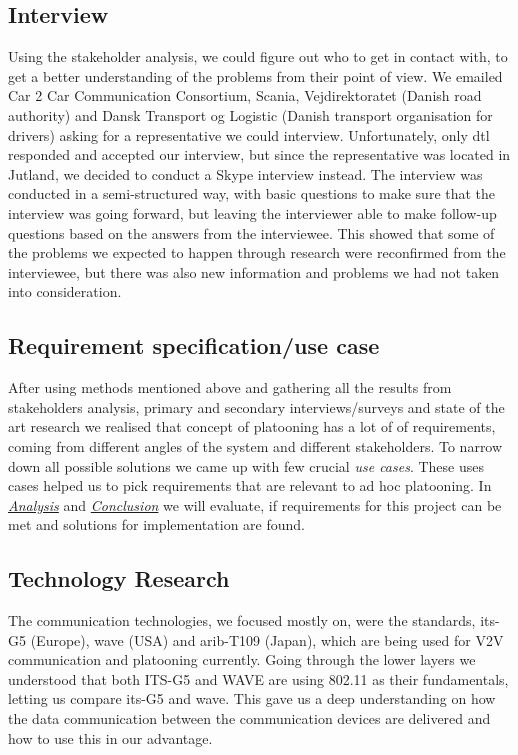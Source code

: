 \subsection{Interview}
Using the stakeholder analysis, we could figure out who to get in contact with, to get a better understanding of the problems from their point of view. We emailed Car 2 Car Communication Consortium, Scania, Vejdirektoratet (Danish road authority) and Dansk Transport og Logistic (Danish transport organisation for drivers) asking for a representative we could interview.
Unfortunately, only \acrshort{dtl} responded and accepted our interview, but since the representative was located in Jutland, we decided to conduct a Skype interview instead. The interview was conducted in a semi-structured way, with basic questions to make sure that the interview was going forward, but leaving the interviewer able to make follow-up questions based on the answers from the interviewee. This showed that some of the problems we expected to happen through research were reconfirmed from the interviewee, but there was also new information and problems we had not taken into consideration.
% 
\subsection{Requirement specification/use case}
After using methods mentioned above and gathering all the results from stakeholders analysis, primary and secondary interviews/surveys and state of the art research we realised that concept of platooning has a lot of of requirements, coming from different angles of the system and different stakeholders. To narrow down all possible solutions we came up with few crucial \emph{use cases}. These uses cases helped us to pick requirements that are relevant to ad hoc platooning. In \hyperref[sec:analysis]{\textit{Analysis}} and \hyperref[sec:conclusion]{\textit{Conclusion}} we will evaluate, if requirements for this project can be met and solutions for implementation are found.
% 
\subsection{Technology Research}
The communication technologies, we focused mostly on, were the standards, \acrshort{its}-G5 (Europe), \acrshort{wave} (USA) and \acrshort{arib}-T109 (Japan), which are being used for \acrshort{V2V} communication and platooning currently. Going through the lower layers we understood that both ITS-G5 and WAVE are using 802.11 as their fundamentals, letting us compare \acrshort{its}-G5 and \acrshort{wave}. This gave us a deep understanding on how the data communication between the communication devices are delivered and how to use this in our advantage.

